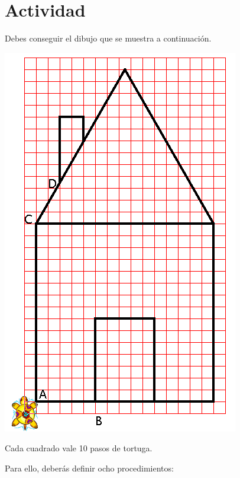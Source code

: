 \documentclass[12pt,twoside,spanish,a4paper]{report}
\begin{document}
\section{Actividad}
   \label{sub:Actividad_Casa}

% 
Debes conseguir el dibujo que se muestra a continuaci\'on.
\begin{center}
   \includegraphics[scale=0.5]{Imagenes_Tutorial/04_Casa.png}

   Cada cuadrado vale 10 pasos de tortuga.
\end{center}
Para ello, deber\'as definir ocho procedimientos:
\end{document}
